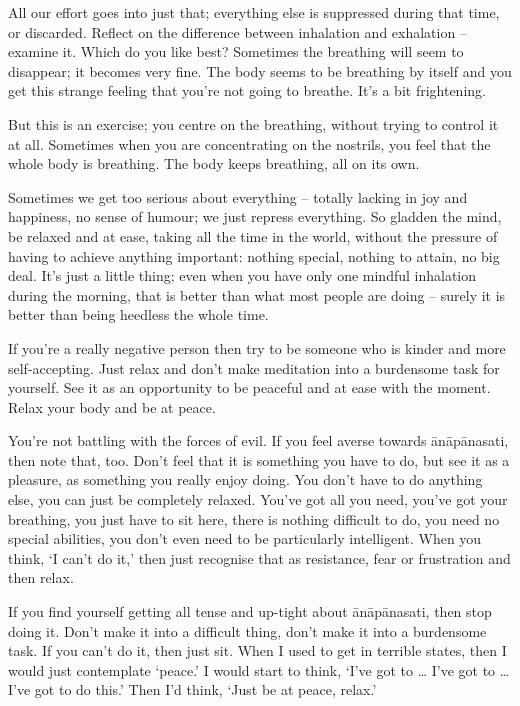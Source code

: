 All our effort goes into just that; everything else is suppressed during that time, or discarded. Reflect on the difference between inhalation and exhalation -- examine it. Which do you like best? Sometimes the breathing will seem to disappear; it becomes very fine. The body seems to be breathing by itself and you get this strange feeling that you're not going to breathe. It's a bit frightening.

But this is an exercise; you centre on the breathing, without trying to control it at all. Sometimes when you are concentrating on the nostrils, you feel that the whole body is breathing. The body keeps breathing, all on its own.

Sometimes we get too serious about everything -- totally lacking in joy and happiness, no sense of humour; we just repress everything. So gladden the mind, be relaxed and at ease, taking all the time in the world, without the pressure of having to achieve anything important: nothing special, nothing to attain, no big deal. It's just a little thing; even when you have only one mindful inhalation during the morning, that is better than what most people are doing -- surely it is better than being heedless the whole time.

If you're a really negative person then try to be someone who is kinder and more self-accepting. Just relax and don't make meditation into a burdensome task for yourself. See it as an opportunity to be peaceful and at ease with the moment. Relax your body and be at peace.

You're not battling with the forces of evil. If you feel averse towards ānāpānasati, then note that, too. Don't feel that it is something you have to do, but see it as a pleasure, as something you really enjoy doing. You don't have to do anything else, you can just be completely relaxed. You've got all you need, you've got your breathing, you just have to sit here, there is nothing difficult to do, you need no special abilities, you don't even need to be particularly intelligent. When you think, `I can't do it,' then just recognise that as resistance, fear or frustration and then relax.

If you find yourself getting all tense and up-tight about ānāpānasati, then stop doing it. Don't make it into a difficult thing, don't make it into a burdensome task. If you can't do it, then just sit. When I used to get in terrible states, then I would just contemplate `peace.' I would start to think, `I've got to \ldots{} I've got to \ldots{} I've got to do this.' Then I'd think, `Just be at peace, relax.'

